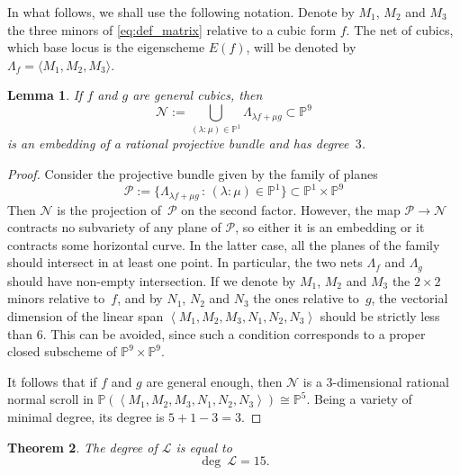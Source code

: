 \documentclass{amsart}
\theoremstyle{plain}
\newtheorem{theorem}{Theorem}
\newtheorem{lem}[theorem]{Lemma}
\theoremstyle{definition}
\newcommand{\p}{\mathbb{P}}
\begin{document}
In what follows, we shall use the following notation.
Denote by $M_1$, $M_2$ and $M_3$ the three minors of \ref{eq:def_matrix} relative to a cubic form $f$.
The net of cubics, which base locus is the eigenscheme $E(f)$, will be denoted by $\Lambda_f = \langle M_1, M_2, M_3 \rangle$. 
\begin{lem}
\label{lem:scroll}
 If $f$ and $g$ are general cubics, then
 \[
   \mathcal{N} := \bigcup_{(\lambda : \mu) \in \p^1} \Lambda_{\lambda f + \mu g} \subset \p^9
 \]
 is an embedding of a rational projective bundle and has degree~$3$.
\end{lem}
\begin{proof}
Consider the projective bundle given by the family of planes
%
\[
{\mathcal P} := \{ \Lambda_{\lambda f + \mu g} \, : \, (\lambda: \mu)\in \p^1 \} \subset \p^1 \times \p^9
\]
%
Then $\mathcal{N}$ is the projection of~$\mathcal{P}$ on the second factor.
However, the map ${\mathcal P} \to {\mathcal N}$ contracts no subvariety of any plane of ${\mathcal P}$, so either it is an embedding or it contracts some horizontal curve. In the latter case, all the planes of the family should intersect in at least one point. In particular, the two nets $\Lambda_f$ and $\Lambda_g$ should have non-empty intersection.
If we denote by $M_1$, $M_2$ and $M_3$ the $2 \times 2$ minors relative to~$f$, and by $N_1$, $N_2$ and $N_3$ the ones relative to~$g$, the vectorial dimension of the linear span $\left\langle M_1, M_2, M_3, N_1, N_2, N_3 \right\rangle$ should be strictly less than $6$. This can be avoided, since such a condition corresponds to a proper closed subscheme of $\p^9 \times \p^9$.

It follows that if $f$ and $g$ are general enough, then $\mathcal{N}$ is a $3$-dimensional rational normal scroll in $\p(\left\langle M_1, M_2, M_3, N_1, N_2, N_3 \right\rangle) \cong \p^5$. 
Being a variety of minimal degree, its degree is $5+1-3 = 3$.
\end{proof}

\begin{theorem}
The degree of $\mathcal L$ is equal to
\[
  \deg \ \mathcal L =  15.
\]
\end{theorem}
\end{document}
